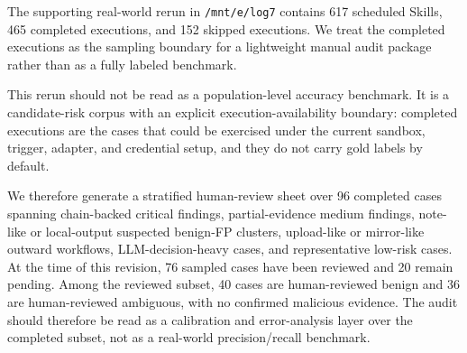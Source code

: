 The supporting real-world rerun in \texttt{/mnt/e/log7} contains 617 scheduled Skills, 465 completed executions, and 152 skipped executions. We treat the completed executions as the sampling boundary for a lightweight manual audit package rather than as a fully labeled benchmark.

This rerun should not be read as a population-level accuracy benchmark. It is a candidate-risk corpus with an explicit execution-availability boundary: completed executions are the cases that could be exercised under the current sandbox, trigger, adapter, and credential setup, and they do not carry gold labels by default.

We therefore generate a stratified human-review sheet over 96 completed cases spanning chain-backed critical findings, partial-evidence medium findings, note-like or local-output suspected benign-FP clusters, upload-like or mirror-like outward workflows, LLM-decision-heavy cases, and representative low-risk cases. At the time of this revision, 76 sampled cases have been reviewed and 20 remain pending. Among the reviewed subset, 40 cases are human-reviewed benign and 36 are human-reviewed ambiguous, with no confirmed malicious evidence. The audit should therefore be read as a calibration and error-analysis layer over the completed subset, not as a real-world precision/recall benchmark.
